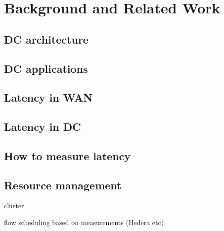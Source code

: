 \chapter{Background and Related Work}

\section{DC architecture}

\section{DC applications}

\section{Latency in WAN}

\section{Latency in DC}

\section{How to measure latency}

\section{Resource management}
cluster

flow scheduling based on measurements (Hedera etc)
